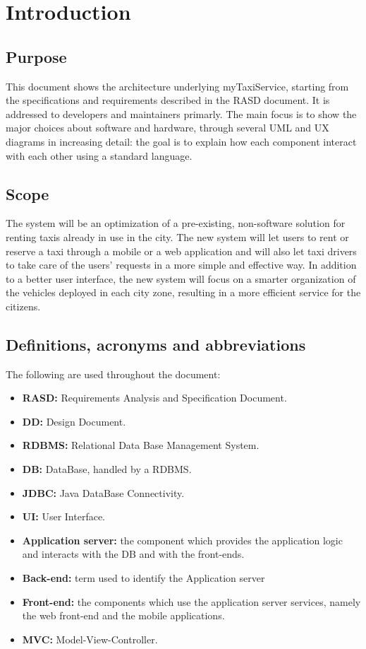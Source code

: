 \section{Introduction}

\subsection{Purpose}
This document shows the architecture underlying myTaxiService, starting from the specifications and requirements described in the RASD document. It is addressed to developers and maintainers primarly. The main focus is to show the major choices about software and hardware, through several UML and UX diagrams in increasing detail: the goal is to explain how each component interact with each other using a standard language.

\subsection{Scope}
The system will be an optimization of a pre-existing, non-software solution for renting taxis already in use in the city. The new system will let users to rent or reserve a taxi through a mobile or a web application and will also let taxi drivers to take care of the users' requests in a more simple and effective way. In addition to a better user interface, the new system will focus on a smarter organization of the vehicles deployed in each city zone, resulting in a more efficient service for the citizens.

\subsection{Definitions, acronyms and abbreviations}
The following are used throughout the document:
\begin{itemize}
\item\textbf{RASD:} Requirements Analysis and Specification Document.
\item\textbf{DD:} Design Document.
\item\textbf{RDBMS:} Relational Data Base Management System.
\item\textbf{DB:} DataBase, handled by a RDBMS.
\item\textbf{JDBC:} Java DataBase Connectivity.
\item\textbf{UI:} User Interface.
\item\textbf{Application server:} the component which provides the application logic and interacts with the DB and with the front-ends.
\item\textbf{Back-end:} term used to identify the Application server
\item\textbf{Front-end:} the components which use the application server services, namely the web front-end and the mobile applications.
\item\textbf{MVC:} Model-View-Controller.
\end{itemize}

